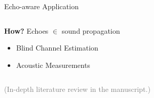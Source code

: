 \begin{frame}{Echo-aware Application}
\begin{columns}[T,onlytextwidth]
        \pause[7]
        \begin{block}{\textbf{How?}}
            \small
            Echoes $\in$ sound propagation
            \begin{itemize}
                \item Blind Channel Estimation
                \\{\footnotesize\cite{lin2007blind,crocco2017uncalibrated}}
                \item Acoustic Measurements
                \\{\footnotesize\cite{eaton2015ace,kuttruff2016room}}
            \end{itemize}
        \end{block}
    \end{columns}

    \begin{center}
        \textcolor{gray}{\small (In-depth literature review in the manuscript.)}
    \end{center}
\end{frame}

\subsection{\mirage}

